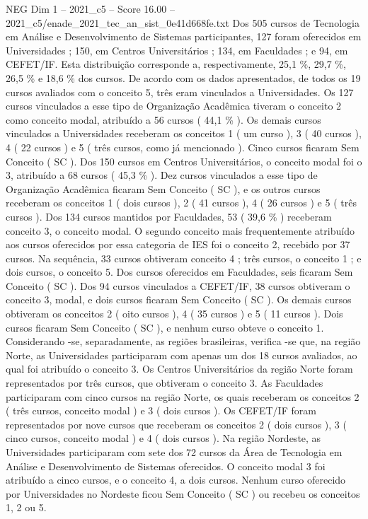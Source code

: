 \begin{textsample}{NEG Dim 1 – 2021\_c5 – Score 16.00 – 2021\_c5/enade\_2021\_tec\_an\_sist\_0e41d668fe.txt}
Dos 505 cursos de Tecnologia em Análise e Desenvolvimento de Sistemas participantes, 127 foram oferecidos em Universidades ; 150, em Centros Universitários ; 134, em Faculdades ; e 94, em CEFET/IF.
Esta distribuição corresponde a, respectivamente, 25,1 \%, 29,7 \%, 26,5 \% e 18,6 \% dos cursos.
De acordo com os dados apresentados, de todos os 19 cursos avaliados com o conceito 5, três eram vinculados a Universidades.
Os 127 cursos vinculados a esse tipo de Organização Acadêmica tiveram o conceito 2 como conceito modal, atribuído a 56 cursos ( 44,1 \% ).
Os demais cursos vinculados a Universidades receberam os conceitos 1 ( um curso ), 3 ( 40 cursos ), 4 ( 22 cursos ) e 5 ( três cursos, como já mencionado ).
Cinco cursos ficaram Sem Conceito ( SC ).
Dos 150 cursos em Centros Universitários, o conceito modal foi o 3, atribuído a 68 cursos ( 45,3 \% ).
Dez cursos vinculados a esse tipo de Organização Acadêmica ficaram Sem Conceito ( SC ), e os outros cursos receberam os conceitos 1 ( dois cursos ), 2 ( 41 cursos ), 4 ( 26 cursos ) e 5 ( três cursos ).
Dos 134 cursos mantidos por Faculdades, 53 ( 39,6 \% ) receberam conceito 3, o conceito modal.
O segundo conceito mais frequentemente atribuído aos cursos oferecidos por essa categoria de IES foi o conceito 2, recebido por 37 cursos.
Na sequência, 33 cursos obtiveram conceito 4 ; três cursos, o conceito 1 ; e dois cursos, o conceito 5.
Dos cursos oferecidos em Faculdades, seis ficaram Sem Conceito ( SC ).
Dos 94 cursos vinculados a CEFET/IF, 38 cursos obtiveram o conceito 3, modal, e dois cursos ficaram Sem Conceito ( SC ).
Os demais cursos obtiveram os conceitos 2 ( oito cursos ), 4 ( 35 cursos ) e 5 ( 11 cursos ).
Dois cursos ficaram Sem Conceito ( SC ), e nenhum curso obteve o conceito 1.
Considerando -se, separadamente, as regiões brasileiras, verifica -se que, na região Norte, as Universidades participaram com apenas um dos 18 cursos avaliados, ao qual foi atribuído o conceito 3.
Os Centros Universitários da região Norte foram representados por três cursos, que obtiveram o conceito 3.
As Faculdades participaram com cinco cursos na região Norte, os quais receberam os conceitos 2 ( três cursos, conceito modal ) e 3 ( dois cursos ).
Os CEFET/IF foram representados por nove cursos que receberam os conceitos 2 ( dois cursos ), 3 ( cinco cursos, conceito modal ) e 4 ( dois cursos ).
Na região Nordeste, as Universidades participaram com sete dos 72 cursos da Área de Tecnologia em Análise e Desenvolvimento de Sistemas oferecidos.
O conceito modal 3 foi atribuído a cinco cursos, e o conceito 4, a dois cursos.
Nenhum curso oferecido por Universidades no Nordeste ficou Sem Conceito ( SC ) ou recebeu os conceitos 1, 2 ou 5.

\end{textsample}
